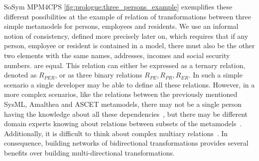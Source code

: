 \begin{copiedFrom}{SoSym MPM4CPS}
\autoref{fig:prologue:three_persons_example} exemplifies these different possibilities at the example of relation of transformations between three simple metamodels for persons, employees and residents.
We use an informal notion of consistency, defined more precisely later on, which requires that if any person, employee or resident is contained in a model, there must also be the other two elements with the same names, addresses, incomes and social security numbers. %
are equal.
This relation can either be expressed as a ternary relation, denoted as $R_{PER}$, or as three binary relations $R_{PE}, R_{PR}, R_{ER}$.
In such a simple scenario a single developer may be able to define all these relations.
However, in a more complex scenarios, like the relations between the previously mentioned SysML, Amalthea and ASCET metamodels, there may not be a single person having the knowledge about all these dependencies~\cite{petrenko2008a}, but there may be different domain experts knowing about relations between subsets of the metamodels~\cite{klare2018docsym}.
Additionally, it is difficult to think about complex multiary relations~\cite{stevens2017a}.
In consequence, building networks of bidirectional transformations provides several benefits over building multi-directional transformations.


\end{copiedFrom}
